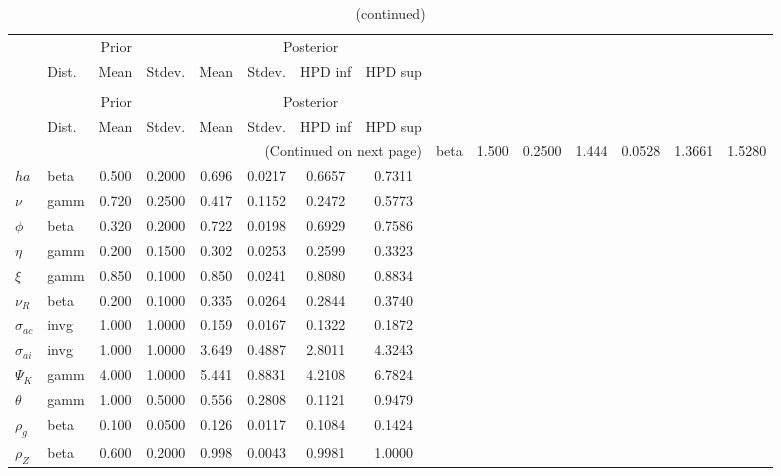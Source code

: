  
\begin{center}
\begin{longtable}{llcccccc} 
\caption{Results from Metropolis-Hastings (parameters)}
 \label{Table:MHPosterior:1}\\
\toprule 
  & \multicolumn{3}{c}{Prior}  &  \multicolumn{4}{c}{Posterior} \\
  \cmidrule(r{.75em}){2-4} \cmidrule(r{.75em}){5-8}
  & Dist. & Mean  & Stdev. & Mean & Stdev. & HPD inf & HPD sup\\
\midrule \endfirsthead 
\caption{(continued)}\\\toprule 
  & \multicolumn{3}{c}{Prior}  &  \multicolumn{4}{c}{Posterior} \\
  \cmidrule(r{.75em}){2-4} \cmidrule(r{.75em}){5-8}
  & Dist. & Mean  & Stdev. & Mean & Stdev. & HPD inf & HPD sup\\
\midrule \endhead 
\bottomrule \multicolumn{8}{r}{(Continued on next page)} \endfoot 
\bottomrule \endlastfoot 
${\sigma}$ & beta &   1.500 & 0.2500 &   1.444& 0.0528 &  1.3661 &  1.5280 \\ 
${ha}$ & beta &   0.500 & 0.2000 &   0.696& 0.0217 &  0.6657 &  0.7311 \\ 
$\nu$ & gamm &   0.720 & 0.2500 &   0.417& 0.1152 &  0.2472 &  0.5773 \\ 
${\phi}$ & beta &   0.320 & 0.2000 &   0.722& 0.0198 &  0.6929 &  0.7586 \\ 
${\eta}$ & gamm &   0.200 & 0.1500 &   0.302& 0.0253 &  0.2599 &  0.3323 \\ 
$\xi$ & gamm &   0.850 & 0.1000 &   0.850& 0.0241 &  0.8080 &  0.8834 \\ 
${\nu_R}$ & beta &   0.200 & 0.1000 &   0.335& 0.0264 &  0.2844 &  0.3740 \\ 
${\sigma_{ac}}$ & invg &   1.000 & 1.0000 &   0.159& 0.0167 &  0.1322 &  0.1872 \\ 
${\sigma_{ai}}$ & invg &   1.000 & 1.0000 &   3.649& 0.4887 &  2.8011 &  4.3243 \\ 
${\Psi_{K}}$ & gamm &   4.000 & 1.0000 &   5.441& 0.8831 &  4.2108 &  6.7824 \\ 
${\theta}$ & gamm &   1.000 & 0.5000 &   0.556& 0.2808 &  0.1121 &  0.9479 \\ 
${\rho_g}$ & beta &   0.100 & 0.0500 &   0.126& 0.0117 &  0.1084 &  0.1424 \\ 
${\rho_Z}$ & beta &   0.600 & 0.2000 &   0.998& 0.0043 &  0.9981 &  1.0000 \\ 

\end{longtable}
\end{center}
